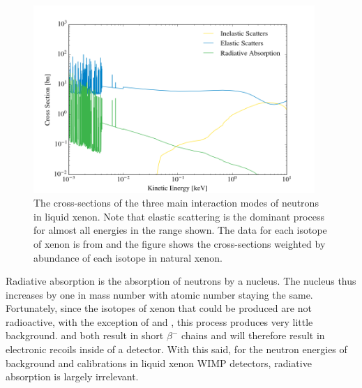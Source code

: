 \begin{figure}[t]
	\centering
	\includegraphics[width=0.95\textwidth]{neutron_cross_sections}
	\caption{The cross-sections of the three main interaction modes of neutrons in liquid xenon.  Note that elastic scattering is the dominant process for almost all energies in the range shown.  The data for each isotope of xenon is from  and the figure shows the cross-sections weighted by abundance of each isotope in natural xenon.}
	\label{fig:neutron_cross_section}
\end{figure}


Radiative absorption is the absorption of neutrons by a nucleus.  The nucleus thus increases by one in mass number with atomic number staying the same.  Fortunately, since the isotopes of xenon that could be produced are not radioactive, with the exception of  and , this process produces very little background.   and  both result in short $\beta^-$ chains and will therefore result in electronic recoils inside of a detector.  With this said, for the neutron energies of background and calibrations in liquid xenon WIMP detectors, radiative absorption is largely irrelevant.

